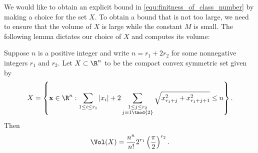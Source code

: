       We would like to obtain an explicit bound in \cref{equ:finitness_of_class_number} by making a choice for the set $X$. To obtain a bound that is not too large, we need to ensure that the volume of $X$ is large while the constant $M$ is small. The following lemma dictates our choice of $X$ and computes its volume:

      \begin{lemma}\label{lem:Minkowski_bound_lemma}
        Suppose $n$ is a positive integer and write $n = r_{1}+2r_{2}$ for some nonnegative integers $r_{1}$ and $r_{2}$. Let $X \subset \R^{n}$ to be the compact convex symmetric set given by
        \[
          X = \left\{\mathbf{x} \in \R^{n}:\sum_{1 \le i \le r_{1}}|x_{i}|+2\sum_{\substack{1 \le j \le r_{2} \\ j \equiv 1 \tmod{2}}}\sqrt{x_{r_{1}+j}^{2}+x_{r_{1}+j+1}^{2}} \le n\right\}.
        \]
        Then
        \[
          \Vol(X) = \frac{n^{n}}{n!}2^{r_{1}}\left(\frac{\pi}{2}\right)^{r_{2}}.
        \]
      \end{lemma}

